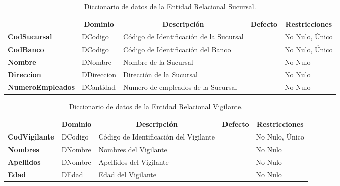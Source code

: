 \begin{table}[H]
\centering
\caption{Diccionario de datos de la Entidad Relacional Sucursal.}
\label{tab-DiccR-2g}
\begin{tabular}{>{\bfseries}m{4.0cm}>{}m{3.0cm}>{}m{6.0cm}>{}m{5.0cm}>{}m{2.0cm}}
\toprule
\multicolumn{1}{c}{\textbf{Atributo}} & \multicolumn{1}{c}{\textbf{Dominio}} & \multicolumn{1}{c}{\textbf{Descripción}} & \multicolumn{1}{c}{\textbf{Defecto}} & \multicolumn{1}{c}{\textbf{Restricciones}} \\ \midrule
CodSucursal	&	DCodigo	&	Código de Identificación de la Sucursal	&		&	No Nulo, Único\\
CodBanco	&	DCodigo	&	Código de Identificación del Banco	&		&	No Nulo, Único\\
Nombre	&	DNombre	&	Nombre de la Sucursal	&		&	No Nulo\\
Direccion	&	DDireccion	&	Dirección de la Sucursal	&		&	No Nulo\\
NumeroEmpleados	&	DCantidad	&	Numero de empleados de la Sucursal	&		&	No Nulo\\
\bottomrule
\end{tabular}
\end{table}

\begin{table}[H]
\centering
\caption{Diccionario de datos de la Entidad Relacional Vigilante.}
\label{tab-DiccR-2h}
\begin{tabular}{>{\bfseries}m{4.0cm}>{}m{3.0cm}>{}m{6.0cm}>{}m{5.0cm}>{}m{2.0cm}}
\toprule
\multicolumn{1}{c}{\textbf{Atributo}} & \multicolumn{1}{c}{\textbf{Dominio}} & \multicolumn{1}{c}{\textbf{Descripción}} & \multicolumn{1}{c}{\textbf{Defecto}} & \multicolumn{1}{c}{\textbf{Restricciones}} \\ \midrule
CodVigilante	&	DCodigo	&	Código de Identificación del Vigilante	&		&	No Nulo, Único\\
Nombres	&	DNombre	&	Nombres del Vigilante	&		&	No Nulo\\
Apellidos	&	DNombre	&	Apellidos del Vigilante	&		&	No Nulo\\
Edad	&	DEdad	&	Edad del Vigilante	&		&	No Nulo\\
\bottomrule
\end{tabular}
\end{table}

